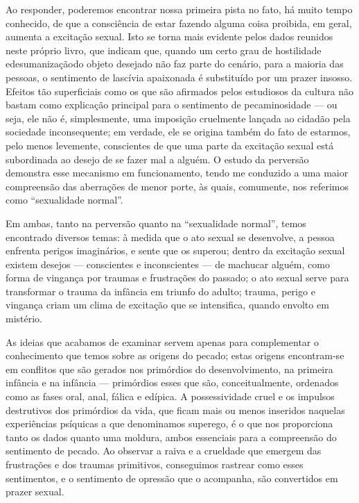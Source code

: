 Ao responder, poderemos encontrar nossa primeira pista no fato, há
muito tempo conhecido, de que a consciência de estar fazendo alguma
coisa proibida, em geral, aumenta a excitação sexual. Isto se torna
mais evidente pelos dados reunidos neste próprio livro, que indicam
que, quando um certo grau de hostilidade e\idxsexuedes[|(] desumanização\idxdesuexci[|(] do objeto
desejado não faz parte do cenário, para a maioria das pessoas, o
sentimento de lascívia apaixonada é substituído por um prazer insosso.
Efeitos tão superficiais como os que são afirmados pelos estudiosos da
cultura não bastam como explicação principal para o sentimento de
pecaminosidade --- ou seja, ele não é, simplesmente, uma imposição
cruelmente lançada ao cidadão pela sociedade inconsequente; em
verdade, ele se origina\idxpecadori{} também do fato de estarmos, pelo menos
levemente, conscientes de que uma parte da excitação sexual está
subordinada ao desejo de se fazer mal a alguém. O estudo da perversão
demonstra esse mecanismo em funcionamento, tendo me conduzido a uma
maior compreensão das aberrações de menor porte, às quais, comumente,
nos referimos como\idxpervnorma{} ``sexualidade\idxnorma{} normal''.

Em ambas, tanto na perversão quanto na ``sexualidade
normal'', temos encontrado diversos temas: à medida que o
ato sexual se desenvolve, a pessoa\idxperigo{} enfrenta perigos\idxpervexpos{} imaginários, e
sente que os superou; dentro da excitação sexual existem desejos ---
conscientes e inconscientes --- de machucar alguém, como forma de
vingança\idxvinga{} por traumas\idxtrauma{} e frustrações do passado; o ato sexual serve para
transformar o trauma da infância em triunfo do adulto; trauma, perigo e
vingança criam um clima de excitação que se intensifica, quando envolto
em mistério.

As ideias que acabamos de examinar servem apenas para complementar o
conhecimento que temos sobre as origens do pecado; estas origens
encontram-se em conflitos que são gerados nos primórdios do
desenvolvimento, na primeira infância e na infância --- primórdios
esses que são, conceitualmente, ordenados como as fases oral, anal,
fálica e edípica.\idxlibid{} A possessividade cruel e os impulsos destrutivos dos
primórdios da vida, que ficam mais ou menos inseridos naquelas
experiências psíquicas a que denominamos superego, é o que nos
proporciona tanto os dados quanto uma moldura, ambos essenciais para a
compreensão do sentimento de pecado. Ao observar a raiva e a crueldade
que emergem das frustrações e dos traumas primitivos, conseguimos
rastrear como esses sentimentos, e o sentimento de opressão que o
acompanha, são convertidos em prazer sexual.

